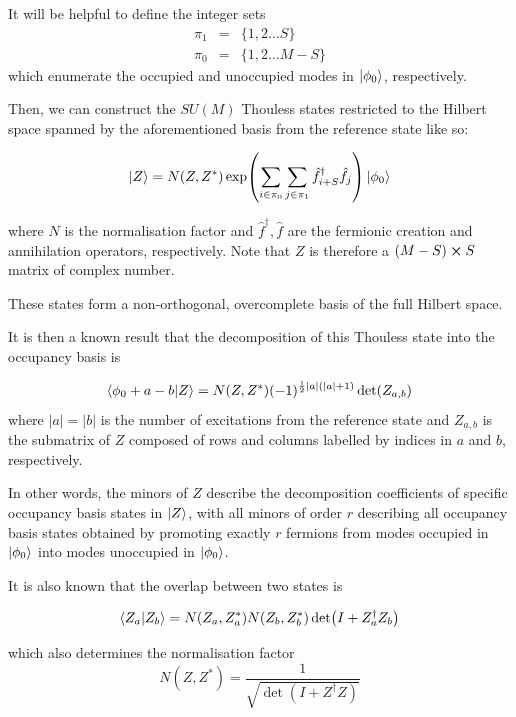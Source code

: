 \documentclass[12pt]{article}
\newcommand{\hc}{^\dagger}
\begin{document}
	It will be helpful to define the integer sets
	\begin{eqnarray*}
	\pi_1 &=& \{1, 2 \dots S\}\\
	\pi_0 &=& \{1, 2 \dots M - S\}
	\end{eqnarray*}
	which enumerate the occupied and unoccupied modes in $\ket{\phi_0}$, respectively.
	
	Then, we can construct the $SU(M)$ Thouless states restricted to the Hilbert space spanned by the aforementioned basis from the reference state like so:
	
	\begin{equation}
	\ket{Z} = N(Z, Z^*) \exp(\sum_{i\in\pi_0}\sum_{j\in\pi_1}\hat{f}_{i+S}\hc \hat{f}_j) \ket{\phi_0} 
	\end{equation}
	
	where $N$ is the normalisation factor and $\hat{f}\hc, \hat{f}$ are the fermionic creation and annihilation operators, respectively. Note that $Z$ is therefore a $(M-S) \cross S$ matrix of complex number.
	
	These states form a non-orthogonal, overcomplete basis of the full Hilbert space.
	
	It is then a known result that the decomposition of this Thouless state into the occupancy basis is
	
	\begin{equation} \label{eq:decomposition}
	\braket{\phi_0 + a - b}{Z} = N(Z, Z^*) (-1)^{\frac{1}{2}|a|(|a| + 1)} \det(Z_{a,b})
	\end{equation}
	where $|a|=|b|$ is the number of excitations from the reference state and $Z_{a,b}$ is the submatrix of $Z$ composed of rows and columns labelled by indices in $a$ and $b$, respectively.
	
	In other words, the minors of $Z$ describe the decomposition coefficients of specific occupancy basis states in $\ket{Z}$, with all minors of order $r$ describing all occupancy basis states obtained by promoting exactly $r$ fermions from modes occupied in $\ket{\phi_0}$ into modes unoccupied in $\ket{\phi_0}$.
	
	It is also known that the overlap between two states is
	
	\begin{equation}
	\braket{Z_a}{Z_b} = N(Z_a, Z_a^*)N(Z_b, Z_b^*) \det(I + Z_a\hc Z_b)
	\end{equation}
	
	which also determines the normalisation factor
	\begin{equation}
	N(Z, Z^*) = \frac{1}{\sqrt{\det(I + Z\hc Z)}}
	\end{equation}
	
\end{document}
